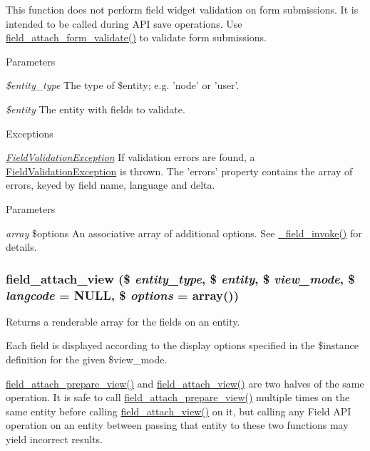 This function does not perform field widget validation on form submissions. It is intended to be called during API save operations. Use \hyperlink{group__field__attach_ga8c9a9775772774cefae4f6b9959d477e}{field\_\-attach\_\-form\_\-validate()} to validate form submissions.


\begin{DoxyParams}{Parameters}
\item[{\em \$entity\_\-type}]The type of \$entity; e.g. 'node' or 'user'. \item[{\em \$entity}]The entity with fields to validate. \end{DoxyParams}

\begin{DoxyExceptions}{Exceptions}
\item[{\em \hyperlink{classFieldValidationException}{FieldValidationException}}]If validation errors are found, a \hyperlink{classFieldValidationException}{FieldValidationException} is thrown. The 'errors' property contains the array of errors, keyed by field name, language and delta. \end{DoxyExceptions}

\begin{DoxyParams}{Parameters}
\item[{\em array}]\$options An associative array of additional options. See \hyperlink{group__field__attach_ga65f891a5eea6513f8505f5cfc5894896}{\_\-field\_\-invoke()} for details. \end{DoxyParams}
\hypertarget{group__field__attach_gaa752a8fd31173fd2308d71eb059e00c7}{
\subsubsection[{field\_\-attach\_\-view}]{\setlength{\rightskip}{0pt plus 5cm}field\_\-attach\_\-view (\$ {\em entity\_\-type}, \/  \$ {\em entity}, \/  \$ {\em view\_\-mode}, \/  \$ {\em langcode} = {\ttfamily NULL}, \/  \$ {\em options} = {\ttfamily array()})}}
\label{group__field__attach_gaa752a8fd31173fd2308d71eb059e00c7}
Returns a renderable array for the fields on an entity.

Each field is displayed according to the display options specified in the \$instance definition for the given \$view\_\-mode.

\hyperlink{group__field__attach_ga12b5fce5e2b2adb487c485c63bfe0298}{field\_\-attach\_\-prepare\_\-view()} and \hyperlink{group__field__attach_gaa752a8fd31173fd2308d71eb059e00c7}{field\_\-attach\_\-view()} are two halves of the same operation. It is safe to call \hyperlink{group__field__attach_ga12b5fce5e2b2adb487c485c63bfe0298}{field\_\-attach\_\-prepare\_\-view()} multiple times on the same entity before calling \hyperlink{group__field__attach_gaa752a8fd31173fd2308d71eb059e00c7}{field\_\-attach\_\-view()} on it, but calling any Field API operation on an entity between passing that entity to these two functions may yield incorrect results.

